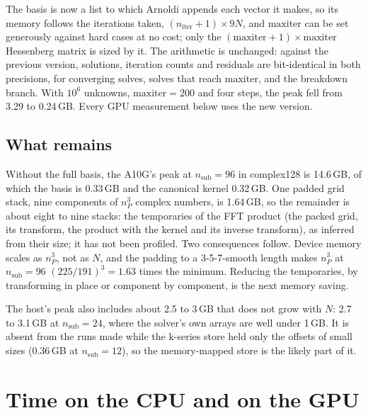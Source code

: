 \documentclass[11pt,a4paper]{article}
\newcommand{\nsub}{n_{\mathrm{sub}}}
\newcommand{\nP}{n_{P}}
\begin{document}
The basis is now a list to which Arnoldi appends each vector it makes, so its memory follows the iterations taken,
$(n_{\mathrm{iter}}+1)\times 9N$, and $\mathrm{maxiter}$ can be set generously against hard cases at no cost; only the
$(\mathrm{maxiter}+1)\times\mathrm{maxiter}$ Hessenberg matrix is sized by it. The arithmetic is unchanged: against the
previous version, solutions, iteration counts and residuals are bit-identical in both precisions, for converging
solves, solves that reach $\mathrm{maxiter}$, and the breakdown branch. With $10^6$ unknowns, $\mathrm{maxiter} = 200$
and four steps, the peak fell from 3.29 to 0.24\,GB. Every GPU measurement below uses the new version.

\subsection{What remains}

Without the full basis, the A10G's peak at $\nsub = 96$ in complex128 is 14.6\,GB, of which the basis is 0.33\,GB and
the canonical kernel 0.32\,GB. One padded grid stack, nine components of $\nP^3$ complex numbers, is 1.64\,GB, so the
remainder is about eight to nine stacks: the temporaries of the FFT product (the packed grid, its transform, the
product with the kernel and its inverse transform), as inferred from their size; it has not been profiled. Two
consequences follow. Device memory scales as $\nP^3$, not as $N$, and the padding to a 3-5-7-smooth length makes
$\nP^3$ at $\nsub = 96$ $(225/191)^3 = 1.63$ times the minimum. Reducing the temporaries, by transforming in place or
component by component, is the next memory saving.

The host's peak also includes about 2.5 to 3\,GB that does not grow with $N$: 2.7 to 3.1\,GB at $\nsub = 24$, where
the solver's own arrays are well under 1\,GB. It is absent from the runs made while the k-series store held only the
offsets of small sizes (0.36\,GB at $\nsub = 12$), so the memory-mapped store is the likely part of it.

\section{Time on the CPU and on the GPU}\label{sec:time}
\end{document}
